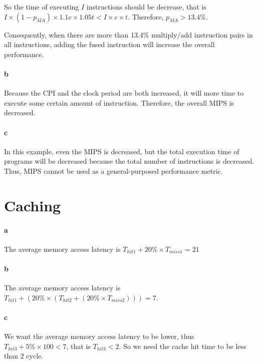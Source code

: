 \documentclass[12pt,letterpaper]{article}
\begin{document}
So the time of executing $I$ instructions should be decrease, that is 
$I\times(1-p_{MA})\times1.1c\times1.05t < I \times c \times t$. Therefore,
$p_{MA}>13.4\%$.

Consequently, when there are more than 13.4\% multiply/add instruction pairs
in all instructions, adding the fused instruction will increase the overall 
performance.

\paragraph*{b}
Because the CPI and the clock period are both increased, it will more time to 
execute some certain amount of instruction. Therefore, the overall MIPS is
decreased.

\paragraph*{c}
In this example, even the MIPS is decreased, but the total execution time of
programs will be decreased because the total number of instructions is 
decreased. Thus, MIPS cannot be used as a general-purposed performance
metric.

\section{Caching}
\paragraph*{a}
The average memory access latency is $T_{hit1} + 20\%\times T_{miss1} = 21$

\paragraph*{b}
The average memory access latency is $T_{hit1} + (20\%\times (T_{hit2} +
(20\%\times T_{miss2}))) = 7$.

\paragraph*{c}
We want the average memory access latency to be lower, thus $T_{hit3} + 5\%
\times 100 < 7$, that is $T_{hit3} < 2$. So we need the cache hit time to be
less than 2 cycle.
\end{document}
